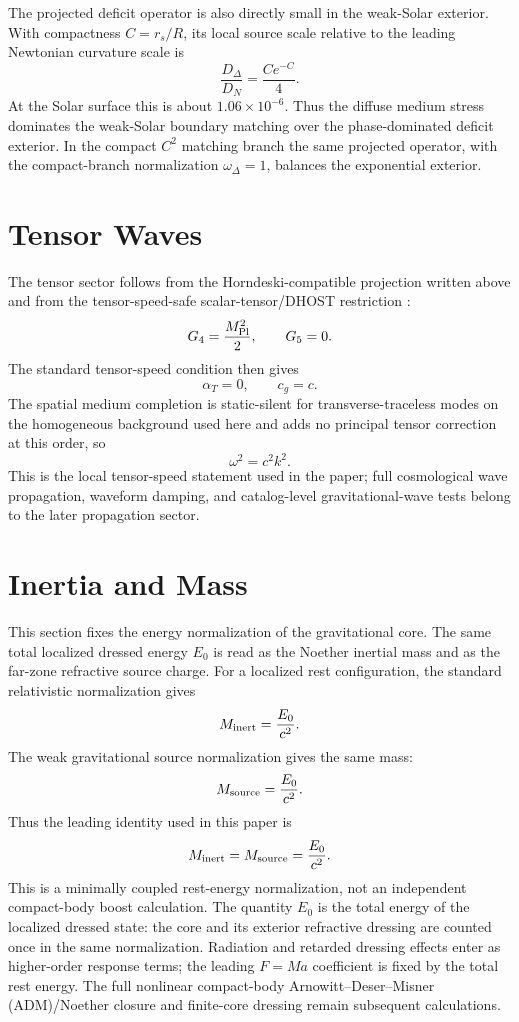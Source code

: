 \documentclass[12pt,a4paper]{article}
\begin{document}
The projected deficit operator is also directly small in the weak-Solar
exterior. With compactness $C=r_s/R$, its local source scale relative to the
leading Newtonian curvature scale is
\[
\frac{D_\Delta}{D_N}=\frac{C e^{-C}}{4}.
\]
At the Solar surface this is about $1.06\times10^{-6}$. Thus the diffuse
medium stress dominates the weak-Solar boundary matching over the
phase-dominated deficit exterior. In the compact $C^2$ matching branch the same
projected operator, with the compact-branch normalization $\omega_\Delta=1$,
balances the exponential exterior.

\section{Tensor Waves}

The tensor sector follows from the Horndeski-compatible projection written above
and from the tensor-speed-safe scalar-tensor/DHOST restriction
\cite{Gleyzes2015,Langlois2016,Achour2016,Crisostomi2016}:
\[
G_4=\frac{M_{\rm Pl}^2}{2},\qquad G_5=0.
\]
The standard tensor-speed condition then gives
\[
\alpha_T=0,
\qquad
c_g=c.
\]
The spatial medium completion is static-silent for transverse-traceless modes
on the homogeneous background used here and adds no principal tensor correction
at this order, so
\[
\omega^2=c^2k^2.
\]
This is the local tensor-speed statement used in the paper; full cosmological
wave propagation, waveform damping, and catalog-level gravitational-wave tests
belong to the later propagation sector.

\section{Inertia and Mass}

This section fixes the energy normalization of the gravitational core. The same total localized dressed energy $E_0$ is read as the Noether inertial mass and as the far-zone refractive source charge. For a localized rest configuration, the standard relativistic normalization gives
\[
M_{\rm inert}=\frac{E_0}{c^2}.
\]
The weak gravitational source normalization gives the same mass:
\[
M_{\rm source}=\frac{E_0}{c^2}.
\]
Thus the leading identity used in this paper is
\[
M_{\rm inert}=M_{\rm source}=\frac{E_0}{c^2}.
\]
This is a minimally coupled rest-energy normalization, not an independent compact-body boost calculation.
The quantity $E_0$ is the total energy of the localized dressed state: the core and its exterior refractive dressing are counted once in the same normalization. Radiation and retarded dressing effects enter as higher-order response terms; the leading $F=Ma$ coefficient is fixed by the total rest energy. The full nonlinear compact-body Arnowitt--Deser--Misner (ADM)/Noether closure and finite-core dressing remain subsequent calculations.
\end{document}
